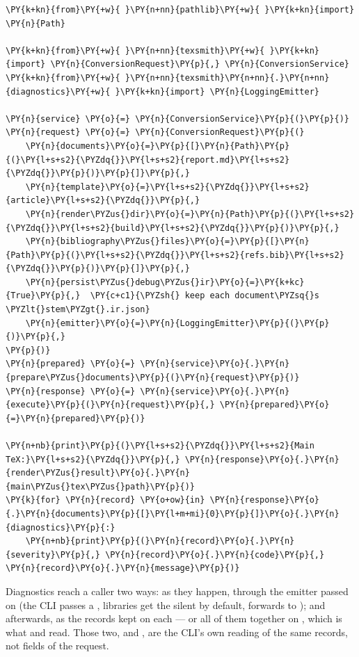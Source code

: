 \documentclass[a4paper,twoside]{article}
\begin{document}
\begin{tscode}[lang=python, engine=pygments]
\begin{Verbatim}[commandchars=\\\{\},breaklines, breakanywhere, commandchars=\\\{\}]
\PY{k+kn}{from}\PY{+w}{ }\PY{n+nn}{pathlib}\PY{+w}{ }\PY{k+kn}{import} \PY{n}{Path}

\PY{k+kn}{from}\PY{+w}{ }\PY{n+nn}{texsmith}\PY{+w}{ }\PY{k+kn}{import} \PY{n}{ConversionRequest}\PY{p}{,} \PY{n}{ConversionService}
\PY{k+kn}{from}\PY{+w}{ }\PY{n+nn}{texsmith}\PY{n+nn}{.}\PY{n+nn}{diagnostics}\PY{+w}{ }\PY{k+kn}{import} \PY{n}{LoggingEmitter}

\PY{n}{service} \PY{o}{=} \PY{n}{ConversionService}\PY{p}{(}\PY{p}{)}
\PY{n}{request} \PY{o}{=} \PY{n}{ConversionRequest}\PY{p}{(}
    \PY{n}{documents}\PY{o}{=}\PY{p}{[}\PY{n}{Path}\PY{p}{(}\PY{l+s+s2}{\PYZdq{}}\PY{l+s+s2}{report.md}\PY{l+s+s2}{\PYZdq{}}\PY{p}{)}\PY{p}{]}\PY{p}{,}
    \PY{n}{template}\PY{o}{=}\PY{l+s+s2}{\PYZdq{}}\PY{l+s+s2}{article}\PY{l+s+s2}{\PYZdq{}}\PY{p}{,}
    \PY{n}{render\PYZus{}dir}\PY{o}{=}\PY{n}{Path}\PY{p}{(}\PY{l+s+s2}{\PYZdq{}}\PY{l+s+s2}{build}\PY{l+s+s2}{\PYZdq{}}\PY{p}{)}\PY{p}{,}
    \PY{n}{bibliography\PYZus{}files}\PY{o}{=}\PY{p}{[}\PY{n}{Path}\PY{p}{(}\PY{l+s+s2}{\PYZdq{}}\PY{l+s+s2}{refs.bib}\PY{l+s+s2}{\PYZdq{}}\PY{p}{)}\PY{p}{]}\PY{p}{,}
    \PY{n}{persist\PYZus{}debug\PYZus{}ir}\PY{o}{=}\PY{k+kc}{True}\PY{p}{,}  \PY{c+c1}{\PYZsh{} keep each document\PYZsq{}s \PYZlt{}stem\PYZgt{}.ir.json}
    \PY{n}{emitter}\PY{o}{=}\PY{n}{LoggingEmitter}\PY{p}{(}\PY{p}{)}\PY{p}{,}
\PY{p}{)}
\PY{n}{prepared} \PY{o}{=} \PY{n}{service}\PY{o}{.}\PY{n}{prepare\PYZus{}documents}\PY{p}{(}\PY{n}{request}\PY{p}{)}
\PY{n}{response} \PY{o}{=} \PY{n}{service}\PY{o}{.}\PY{n}{execute}\PY{p}{(}\PY{n}{request}\PY{p}{,} \PY{n}{prepared}\PY{o}{=}\PY{n}{prepared}\PY{p}{)}

\PY{n+nb}{print}\PY{p}{(}\PY{l+s+s2}{\PYZdq{}}\PY{l+s+s2}{Main TeX:}\PY{l+s+s2}{\PYZdq{}}\PY{p}{,} \PY{n}{response}\PY{o}{.}\PY{n}{render\PYZus{}result}\PY{o}{.}\PY{n}{main\PYZus{}tex\PYZus{}path}\PY{p}{)}
\PY{k}{for} \PY{n}{record} \PY{o+ow}{in} \PY{n}{response}\PY{o}{.}\PY{n}{documents}\PY{p}{[}\PY{l+m+mi}{0}\PY{p}{]}\PY{o}{.}\PY{n}{diagnostics}\PY{p}{:}
    \PY{n+nb}{print}\PY{p}{(}\PY{n}{record}\PY{o}{.}\PY{n}{severity}\PY{p}{,} \PY{n}{record}\PY{o}{.}\PY{n}{code}\PY{p}{,} \PY{n}{record}\PY{o}{.}\PY{n}{message}\PY{p}{)}
\end{Verbatim}
\end{tscode}
Diagnostics reach a caller two ways: as they happen, through the emitter passed
on  (the CLI passes a , libraries get the
silent  by default,  forwards to ); and
afterwards, as the  records kept on each  --- or all of them
together on , which is what  and
 read. Those two, and , are the CLI's own
reading of the same records, not fields of the request.
\end{document}
